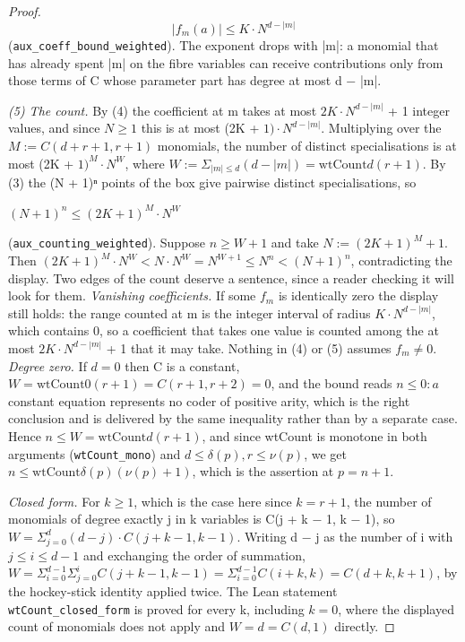 \begin{proof}
\[
|f_{m}(a)| ≤ K · N^{d − |m|}
\]
(\texttt{aux\_\allowbreak{}coeff\_\allowbreak{}bound\_\allowbreak{}weighted}). The exponent drops with |m|: a monomial that has already spent |m| on the fibre variables can receive contributions only from those terms of C whose parameter part has degree at most d − |m|.

\emph{(5) The count.} By (4) the coefficient at m takes at most $2K·N^{d−|m|}$ + 1 integer values, and since $N ≥ 1$ this is at most (2K + $1)·N^{d−|m|}$. Multiplying over the $M := C(d + r + 1, r + 1)$ monomials, the number of distinct specialisations is at most (2K + $1)^{M} · N^{W}$, where $W := Σ_{|m| ≤ d} (d − |m|) = \mathrm{wtCount} d (r + 1)$. By (3) the (N + 1)ⁿ points of the box give pairwise distinct specialisations, so

$(N + 1)^{n} ≤ (2K + 1)^{M} · N^{W}$

(\texttt{aux\_\allowbreak{}counting\_\allowbreak{}weighted}). Suppose $n ≥ W + 1$ and take $N := (2K + 1)^{M} + 1$. Then $(2K + 1)^{M} · N^{W} < N · N^{W} = N^{W+1} ≤ N^{n} < (N + 1)^{n}$, contradicting the display. Two edges of the count deserve a sentence, since a reader checking it will look for them. \emph{Vanishing coefficients.} If some $f_{m}$ is identically zero the display still holds: the range counted at m is the integer interval of radius $K·N^{d−|m|}$, which contains 0, so a coefficient that takes one value is counted among the at most $2K·N^{d−|m|}$ + 1 that it may take. Nothing in (4) or (5) assumes $f_{m} ≠ 0$. \emph{Degree zero.} If $d = 0$ then C is a constant, $W = \mathrm{wtCount} 0 (r + 1) = C(r + 1, r + 2) = 0$, and the bound reads $n ≤ 0: a$ constant equation represents no coder of positive arity, which is the right conclusion and is delivered by the same inequality rather than by a separate case. Hence $n ≤ W = \mathrm{wtCount} d (r + 1)$, and since wtCount is monotone in both arguments (\texttt{wtCount\_\allowbreak{}mono}) and $d ≤ δ(p), r ≤ ν(p)$, we get $n ≤ \mathrm{wtCount} δ(p) (ν(p) + 1)$, which is the assertion at $p = n + 1$.

\emph{Closed form.} For $k ≥ 1$, which is the case here since $k = r + 1$, the number of monomials of degree exactly j in k variables is C(j + k − 1, k − 1), so $W = Σ_{j=0}^{d} (d − j)·C(j + k − 1, k − 1)$. Writing d − j as the number of i with $j ≤ i ≤ d − 1$ and exchanging the order of summation, $W = Σ_{i=0}^{d−1} Σ_{j=0}^{i} C(j + k − 1, k − 1) = Σ_{i=0}^{d−1} C(i + k, k) = C(d + k, k + 1)$, by the hockey-stick identity applied twice. The Lean statement \texttt{wtCount\_\allowbreak{}closed\_\allowbreak{}form} is proved for every k, including $k = 0$, where the displayed count of monomials does not apply and $W = d = C(d, 1)$ directly.

\end{proof}


